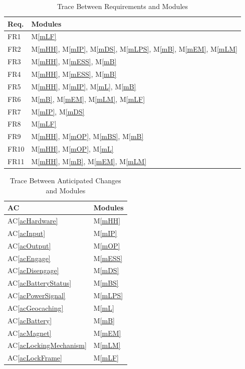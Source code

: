 \documentclass[12pt, titlepage]{article}
\newcommand{\acref}[1]{AC\ref{#1}}
\newcommand{\mref}[1]{M\ref{#1}}
\begin{document}
\begin{table}[H]
\centering
\begin{tabular}{p{} p{}}
\toprule
\textbf{Req.} & \textbf{Modules}\\
\midrule
FR1 & \mref{mLF}\\
FR2 & \mref{mHH}, \mref{mIP}, \mref{mDS}, \mref{mLPS}, \mref{mB}, \mref{mEM}, \mref{mLM}\\
FR3 & \mref{mHH}, \mref{mESS}, \mref{mB}\\
FR4 & \mref{mHH}, \mref{mESS}, \mref{mB}\\
FR5 & \mref{mHH}, \mref{mIP}, \mref{mL}, \mref{mB}\\
FR6 & \mref{mB}, \mref{mEM}, \mref{mLM}, \mref{mLF}\\
FR7 & \mref{mIP}, \mref{mDS}\\
FR8 & \mref{mLF}\\
FR9 & \mref{mHH}, \mref{mOP}, \mref{mBS}, \mref{mB}\\
FR10 & \mref{mHH}, \mref{mOP}, \mref{mL}\\
FR11 & \mref{mHH}, \mref{mB}, \mref{mEM}, \mref{mLM}\\
\bottomrule
\end{tabular}
\caption{Trace Between Requirements and Modules}
\label{TblRT}
\end{table}

\begin{table}[H]
\centering
\begin{tabular}{p{} p{}}
\toprule
\textbf{AC} & \textbf{Modules}\\
\midrule
\acref{acHardware} & \mref{mHH}\\
\acref{acInput} & \mref{mIP}\\
\acref{acOutput} & \mref{mOP}\\
\acref{acEngage} & \mref{mESS}\\
\acref{acDisengage} & \mref{mDS}\\
\acref{acBatteryStatus} & \mref{mBS}\\
\acref{acPowerSignal} & \mref{mLPS}\\
\acref{acGeocaching} & \mref{mL}\\
\acref{acBattery} & \mref{mB}\\
\acref{acMagnet} & \mref{mEM}\\
\acref{acLockingMechanism} & \mref{mLM}\\
\acref{acLockFrame} & \mref{mLF}\\
\bottomrule
\end{tabular}
\caption{Trace Between Anticipated Changes and Modules}
\label{TblACT}
\end{table}
\end{document}
